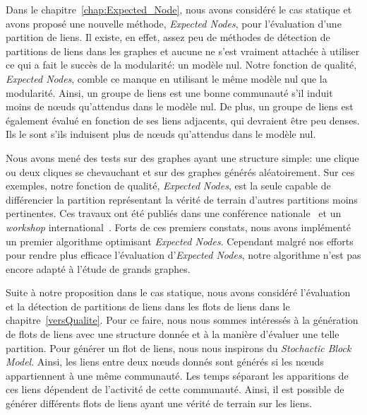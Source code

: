 \bigskip

Dans le chapitre~\ref{chap:Expected_Node}, nous avons considéré le cas statique et avons proposé une nouvelle méthode, \emph{Expected Nodes}, pour l'évaluation d'une partition de liens.
Il existe, en effet, assez peu de méthodes de détection de partitions de liens dans les graphes et aucune ne s'est vraiment attachée à utiliser ce qui a fait le succès de la modularité: un modèle nul.
Notre fonction de qualité, \emph{Expected Nodes}, comble ce manque en utilisant le même modèle nul que la modularité.
Ainsi, un groupe de liens est une bonne communauté s'il induit moins de n\oe{}uds qu'attendus dans le modèle nul.
De plus, un groupe de liens est également évalué en fonction de ses liens adjacents, qui devraient être peu denses.
Ils le sont s'ils induisent plus de n\oe{}uds qu'attendus dans le modèle nul.

\bigskip

Nous avons mené des tests sur des graphes ayant une structure simple: une clique ou deux cliques se chevauchant et sur des graphes générés aléatoirement.
Sur ces exemples, notre fonction de qualité, \emph{Expected} \emph{Nodes}, est la seule capable de différencier la partition représentant la vérité de terrain d'autres partitions moins pertinentes.
Ces travaux ont été publiés dans une conférence nationale~\cite{Gaumont2014} et un \emph{workshop} international~\cite{Gaumont2015}.
Forts de ces premiers constats, nous avons implémenté un premier algorithme optimisant \emph{Expected Nodes}.
Cependant malgré nos efforts pour rendre plus efficace l'évaluation d'\emph{Expected Nodes}, notre algorithme n'est pas encore adapté à l'étude de grands graphes.

\bigskip

Suite à notre proposition dans le cas statique, nous avons considéré l'évaluation et la détection de partitions de liens dans les flots de liens dans le chapitre~\ref{versQualite}.
Pour ce faire, nous nous sommes intéressés à la génération de flots de liens avec une structure donnée et à la manière d'évaluer une telle partition.
Pour générer un flot de liens, nous nous inspirons du \emph{Stochactic Block Model}.
Ainsi, les liens entre deux n\oe{}uds donnés sont générés si les n\oe{}uds appartiennent à une même communauté.
Les temps séparant les apparitions de ces liens dépendent de l'activité de cette communauté.
Ainsi, il est possible de générer différents flots de liens ayant une vérité de terrain sur les liens.

\bigskip

